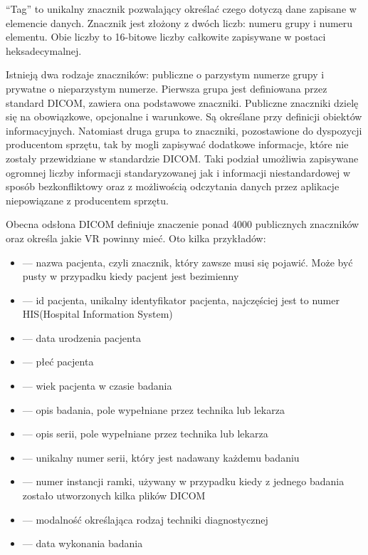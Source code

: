 \par
\enquote{Tag} to unikalny znacznik pozwalający określać czego dotyczą dane zapisane w elemencie danych.
Znacznik jest złożony z dwóch liczb: numeru grupy i numeru elementu.
Obie liczby to 16-bitowe liczby całkowite zapisywane w postaci  heksadecymalnej.

\par
Istnieją dwa rodzaje znaczników: publiczne o parzystym numerze grupy i prywatne o nieparzystym numerze.
Pierwsza grupa jest definiowana przez standard DICOM, zawiera ona podstawowe znaczniki.
Publiczne znaczniki dzielę się na obowiązkowe, opcjonalne i warunkowe.
Są określane przy definicji obiektów informacyjnych.
Natomiast druga grupa to znaczniki, pozostawione do dyspozycji producentom sprzętu, tak by mogli zapisywać dodatkowe informacje, które nie zostały przewidziane w standardzie DICOM.
Taki podział umożliwia zapisywane ogromnej liczby informacji standaryzowanej jak i informacji niestandardowej w sposób bezkonfliktowy oraz z możliwością odczytania danych przez aplikacje niepowiązane z producentem sprzętu.

\par
Obecna odsłona DICOM definiuje znaczenie ponad 4000 publicznych znaczników oraz określa jakie VR powinny mieć.
Oto kilka przykładów:
\begin{itemize}
    \item {} --- nazwa pacjenta, czyli znacznik, który zawsze musi się pojawić.
          Może być pusty w przypadku kiedy pacjent jest bezimienny
    \item {} --- id pacjenta, unikalny identyfikator pacjenta, najczęściej jest to numer HIS(Hospital Information System)
    \item {} --- data urodzenia pacjenta
    \item {} --- płeć pacjenta
    \item {} --- wiek pacjenta w czasie badania
    \item {} --- opis badania, pole wypełniane przez technika lub lekarza
    \item {} --- opis serii, pole wypełniane przez technika lub lekarza
    \item {} --- unikalny numer serii, który jest nadawany każdemu badaniu
    \item {} --- numer instancji ramki, używany w przypadku kiedy z jednego badania zostało utworzonych kilka plików DICOM
    \item {} --- modalność określająca rodzaj techniki diagnostycznej
    \item {} --- data wykonania badania
\end{itemize}



